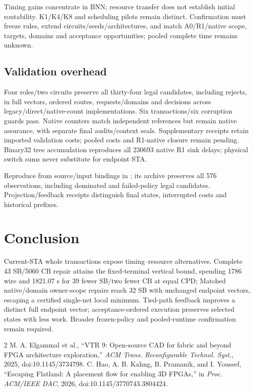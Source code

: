 \documentclass[conference,10pt]{IEEEtran}
\begin{document}
Timing gains concentrate in BNN; resource transfer does not establish initial routability. K1/K4/K8 and scheduling pilots remain distinct. Confirmation must freeze rules, extend circuits/seeds/architectures, and match A0/R1/native scope, targets, domains and acceptance opportunities; pooled complete time remains unknown.

\subsection{Validation overhead}
Four roles/two circuits preserve all thirty-four legal candidates, including rejects, in full vectors, ordered routes, requests/domains and decisions across legacy/direct/native-count implementations. Six transactions/six corruption guards pass. Native counters match independent references but remain native assurance, with separate final audits/context seals. Supplementary receipts retain imported validation costs; pooled costs and R1-native closure remain pending. Binary32 tree accumulation reproduces all 230693 native R1 sink delays; physical switch sums never substitute for endpoint STA.

Reproduce from source/input bindings in ; its archive preserves all 576 observations, including dominated and failed-policy legal candidates. Projection/feedback receipts distinguish final states, interrupted costs and historical prefixes.

\section{Conclusion}
Current-STA whole transactions expose timing--resource alternatives. Complete 43 SB/5060 CB repair attains the fixed-terminal vertical bound, spending 1786 wire and 1821.07 s for 39 fewer SB/two fewer CB at equal CPD; Matched native/domain owner-scope repairs reach 32 SB with unchanged endpoint vectors, escaping a certified single-net local minimum. Tied-path feedback improves a distinct full endpoint vector; acceptance-ordered execution preserves selected states with less work. Broader frozen-policy and pooled-runtime confirmation remain required.

\begin{thebibliography}{2}
 M. A. Elgammal et al., ``VTR 9: Open-source CAD for fabric and beyond FPGA architecture exploration,'' \emph{ACM Trans. Reconfigurable Technol. Syst.}, 2025, doi:10.1145/3734798.
 C. Hao, A. B. Kahng, B. Pramanik, and I. Youssef, ``Escaping Flatland: A placement flow for enabling 3D FPGAs,'' in \emph{Proc. ACM/IEEE DAC}, 2026, doi:10.1145/3770743.3804424.
\end{thebibliography}
\end{document}
